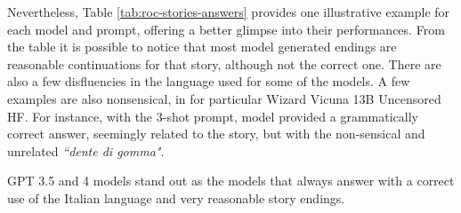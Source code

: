 

Nevertheless, Table \ref{tab:roc-stories-answers} provides one illustrative example for each model and prompt, offering a better glimpse into their performances. From the table it is possible to notice that most model generated endings are reasonable continuations for that story, although not the correct one. There are also a few disfluencies in the language used for some of the models. A few examples are also nonsensical, in for particular Wizard Vicuna 13B Uncensored HF. For instance, with the 3-shot prompt, model provided a grammatically correct answer, seemingly related to the story, but with the non-sensical and unrelated \emph{``dente di gomma"}.

GPT 3.5 and 4 models stand out as the models that always answer with a correct use of the Italian language and very reasonable story endings.
% 


